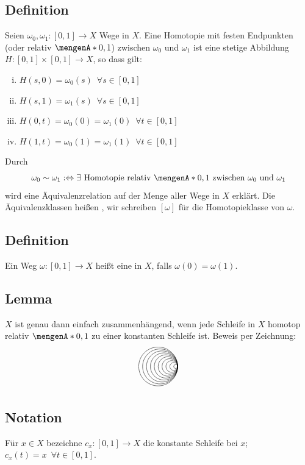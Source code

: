 \subsection[Definition: Homotopie zwischen Wegen]{Definition} %
\label{sub:93}
Seien $\omega_0, \omega_1 : [0,1] \to X$ Wege in $X$. Eine Homotopie mit festen Endpunkten (oder relativ $\set{0,1}$) zwischen $\omega_0$ und $\omega_1$ ist eine stetige 
Abbildung $H : [0,1] \times [0,1] \to X$, so dass gilt:
\begin{enumerate}[(i)]
	\item $H(s,0)= \omega_0(s) \enspace \forall s \in [0,1]$
	\item $H(s,1) = \omega_1(s) \enspace \forall s \in [0,1]$
	\item $H(0,t) = \omega_0(0)= \omega_1(0) \enspace \forall t \in [0,1]$
	\item $H(1,t) = \omega_0(1) = \omega_1(1) \enspace \forall t \in [0,1]$
\end{enumerate}
Durch 
\[
	\omega_0 \sim \omega_1 :\Leftrightarrow \exists \text{ Homotopie relativ } \set{0,1} \text{ zwischen } \omega_0 \text{ und } \omega_1
\]
wird eine Äquivalenzrelation auf der Menge aller Wege in $X$ erklärt. Die Äquivalenzklassen heißen , wir schreiben $[\omega]$ für die 
Homotopieklasse von $\omega$. 

\subsection[Definition: Schleife]{Definition} %
\label{sub:94}
Ein Weg $\omega : [0,1] \to X$ heißt eine  in $X$, falls $\omega(0)= \omega(1)$. 

\subsection[Lemma: Charakterisierung von einfach zusammenhängend über Schleifen]{Lemma} %
\label{sub:95}
$X$ ist genau dann einfach zusammenhängend, wenn jede Schleife in $X$ homotop relativ $\set{0,1}$ zu einer konstanten Schleife ist.
Beweis per Zeichnung:
\[
	\begin{tikzpicture}[scale=0.8]
		\foreach \r in {0.1, 0.2,...,1}{
			\draw (0,0) arc (0:360:\r); 
		}
	\end{tikzpicture}
\]

\subsection[Notation: Konstante Schleife]{Notation} %
\label{sub:96}
Für $x \in X$ bezeichne $c_x : [0,1] \to X$ die konstante Schleife bei $x$; $c_x(t)= x \enspace \forall t \in [0,1]$.

